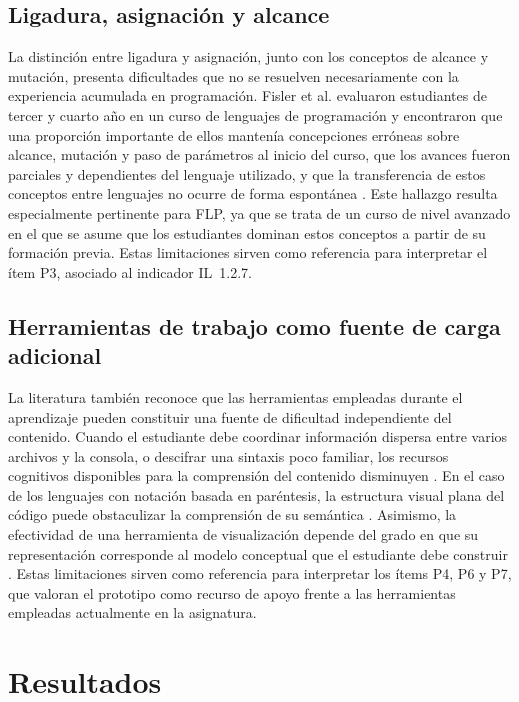 \subsection{Ligadura, asignación y alcance}

La distinción entre ligadura y asignación, junto con los conceptos de alcance y mutación, presenta dificultades que no se resuelven necesariamente con la experiencia acumulada en programación. Fisler et al. evaluaron estudiantes de tercer y cuarto año en un curso de lenguajes de programación y encontraron que una proporción importante de ellos mantenía concepciones erróneas sobre alcance, mutación y paso de parámetros al inicio del curso, que los avances fueron parciales y dependientes del lenguaje utilizado, y que la transferencia de estos conceptos entre lenguajes no ocurre de forma espontánea \cite{fisler2017scope}. Este hallazgo resulta especialmente pertinente para FLP, ya que se trata de un curso de nivel avanzado en el que se asume que los estudiantes dominan estos conceptos a partir de su formación previa. Estas limitaciones sirven como referencia para interpretar el ítem P3, asociado al indicador IL~1.2.7.

\subsection{Herramientas de trabajo como fuente de carga adicional}

La literatura también reconoce que las herramientas empleadas durante el aprendizaje pueden constituir una fuente de dificultad independiente del contenido. Cuando el estudiante debe coordinar información dispersa entre varios archivos y la consola, o descifrar una sintaxis poco familiar, los recursos cognitivos disponibles para la comprensión del contenido disminuyen \cite{sweller2024cognitive, zagami2023}. En el caso de los lenguajes con notación basada en paréntesis, la estructura visual plana del código puede obstaculizar la comprensión de su semántica \cite{gordon2024linguistics}. Asimismo, la efectividad de una herramienta de visualización depende del grado en que su representación corresponde al modelo conceptual que el estudiante debe construir \cite{Sorva2013}. Estas limitaciones sirven como referencia para interpretar los ítems P4, P6 y P7, que valoran el prototipo como recurso de apoyo frente a las herramientas empleadas actualmente en la asignatura.

\section{Resultados}
\label{sec:eval-resultados}

